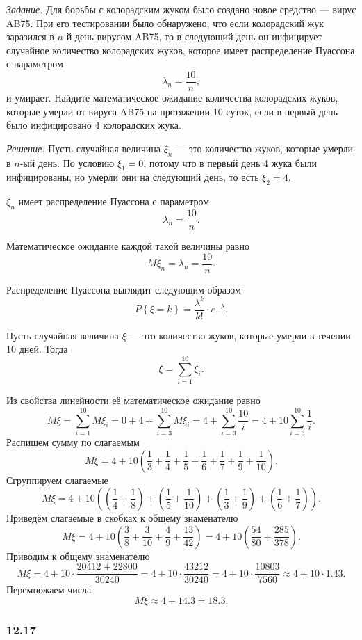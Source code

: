 \textit{Задание.} Для борьбы с колорадским жуком было создано новое средство --- вирус AB75.
При его тестировании было обнаружено,
что если колорадский жук заразился в $n$-й день вирусом AB75,
то в следующий день он инфицирует случайное количество колорадских жуков, которое имеет распределение Пуассона с параметром
$$ \lambda_n =
\frac{10}{n},$$
и умирает.
Найдите математическое ожидание количества колорадских жуков,
которые умерли от вируса AB75 на протяжении 10 суток, если в первый день было инфицировано 4 колорадских жука.

\textit{Решение.} Пусть случайная величина $ \xi_n$ --- это количество жуков, которые умерли в $n$-ый день.
По условию $ \xi_1 = 0$, потому что в первый день 4 жука были инфицированы, но умерли они на следующий день, то есть $ \xi_2 = 4$.

$ \xi_n$ имеет распределение Пуассона с параметром
$$ \lambda_n = 
\frac{10}{n}.$$

Математическое ожидание каждой такой величины равно
$$M \xi_n =
\lambda_n =
\frac{10}{n}.$$

Распределение Пуассона выглядит следующим образом
$$P \left\{ \xi = k \right\} =
\frac{ \lambda^k}{k!} \cdot e^{- \lambda }.$$

Пусть случайная величина $ \xi $ --- это количество жуков, которые умерли в течении 10 дней.
Тогда
$$ \xi =
\sum \limits_{i=1}^{10} \xi_i.$$

Из свойства линейности её математическое ожидание равно
$$M \xi =
\sum \limits_{i=1}^{10} M \xi_i =
0 + 4 + \sum \limits_{i=3}^{10} M \xi_i =
4 + \sum \limits_{i=3}^{10} \frac{10}{i} =
4 + 10 \sum \limits_{i=3}^{10} \frac{1}{i}.$$
Распишем сумму по слагаемым
$$M \xi =
4 + 10 \left( \frac{1}{3} + \frac{1}{4} + \frac{1}{5} + \frac{1}{6} + \frac{1}{7} + \frac{1}{9} + \frac{1}{10} \right).$$
Сгруппируем слагаемые
$$M \xi =
4 + 10 \left( \left( \frac{1}{4} + \frac{1}{8} \right) + \left( \frac{1}{5} + \frac{1}{10} \right) +
\left( \frac{1}{3} + \frac{1}{9} \right) + \left( \frac{1}{6} + \frac{1}{7} \right) \right).$$
Приведём слагаемые в скобках к общему знаменателю
$$M \xi =
4 + 10 \left( \frac{3}{8} + \frac{3}{10} + \frac{4}{9} + \frac{13}{42} \right) =
4 + 10 \left( \frac{54}{80} + \frac{285}{378} \right).$$
Приводим к общему знаменателю
$$M \xi =
4 + 10 \cdot \frac{20412 + 22800}{30240} =
4 + 10 \cdot \frac{43212}{30240} =
4 + 10 \cdot \frac{10803}{7560} \approx
4 + 10 \cdot 1.43.$$
Перемножаем числа
$$M \xi \approx
4 + 14.3 =
18.3.$$

\subsubsection*{12.17}

